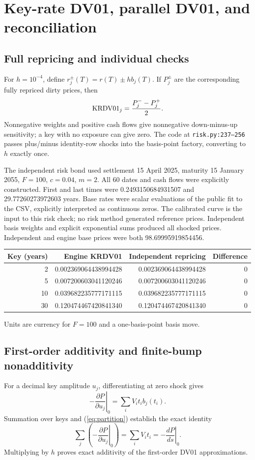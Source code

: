 \documentclass[12pt,a4paper]{article}
\begin{document}
\section{Key-rate DV01, parallel DV01, and reconciliation}
\subsection{Full repricing and individual checks}
For $h=10^{-4}$, define $r_j^\pm(T)=r(T)\pm h b_j(T)$.
If $P_j^\pm$ are the corresponding fully repriced dirty prices, then
\begin{equation}
 {\rm KRDV01}_j=\frac{P_j^- -P_j^+}{2}.
\end{equation}
Nonnegative weights and positive cash flows give nonnegative down-minus-up
sensitivity; a key with no exposure can give zero.
The code at \texttt{risk.py:237--256} passes plus/minus identity-row
shocks into the basis-point factory, converting to $h$ exactly once.

The independent risk bond used settlement 15 April 2025, maturity
15 January 2055, $F=100$, $c=0.04$, $m=2$.
All 60 dates and cash flows were explicitly constructed.
First and last times were 0.2493150684931507 and
29.77260273972603 years. Base rates were scalar evaluations of the
public fit to the CSV, explicitly interpreted as continuous zeros.
The calibrated curve is the input to this risk check; no risk method
generated reference prices. Independent basis weights and explicit
exponential sums produced all shocked prices. Independent and engine
base prices were both 98.69995919854456.
\begin{center}\small
\begin{tabular}{@{}rrrr@{}}
\toprule
Key (years) & Engine KRDV01 & Independent repricing & Difference\\
\midrule
2 & 0.002369064438994428 & 0.002369064438994428 & 0\\
5 & 0.007200603041120246 & 0.007200603041120246 & 0\\
10 & 0.039682235777171115 & 0.039682235777171115 & 0\\
30 & 0.120474467420841340 & 0.120474467420841340 & 0\\
\bottomrule
\end{tabular}
\end{center}
Units are currency for $F=100$ and a one-basis-point basis move.

\subsection{First-order additivity and finite-bump nonadditivity}
For a decimal key amplitude $u_j$, differentiating at zero shock gives
\[
 -\left.\frac{\partial P}{\partial u_j}\right|_0
 =\sum_i V_i t_i b_j(t_i).
\]
Summation over keys and (\ref{eq:partition}) establish the exact identity
\begin{equation}
 \sum_j\left(-\left.\frac{\partial P}{\partial u_j}\right|_0\right)
 =\sum_i V_i t_i=-\left.\frac{dP}{ds}\right|_0.
\end{equation}
Multiplying by $h$ proves exact additivity of the first-order DV01
approximations.
\end{document}
